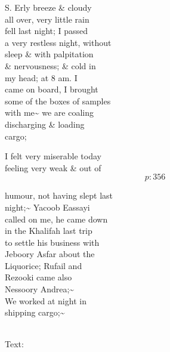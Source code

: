\documentclass{report}
\begin{document}
	\par{
 	S. Erly breeze \& cloudy\ \\all over, very little rain\ \\fell last night; I passed\ \\a very restless night, without\ \\sleep \& with palpitation\ \\\& nervousness; \& cold in\ \\my head; at 8 am. I\ \\came on board, I brought\ \\some of the boxes of samples\ \\with me\~{} we are coaling\ \\discharging \& loading\ \\cargo;\ \\
	}

	\par{
 	I felt very miserable today\ \\feeling very weak \& out of\ \\
  \[p: 356 \]

	}





	\par{
 	humour, not having slept last\ \\night;\~{} Yacoob Eassayi\ \\called on me, he came down\ \\in the Khalifah last trip\ \\to settle his business with\ \\Jeboory Asfar about the\ \\Liquorice; Rufail and\ \\Rezooki came also\ \\Nessoory Andrea;\~{}\ \\We worked at night in\ \\shipping cargo;\~{}\ \\\ \\
	}

	\par{
 	Text:\ \\
	}
\end{document}
